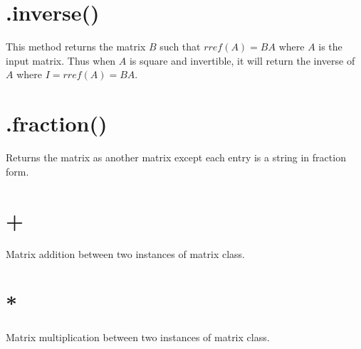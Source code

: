 \documentclass{article}
\begin{document}
\section{.inverse()}
This method returns the matrix \(B\) such that \(rref(A) = BA\) where \(A\) is the input matrix.
Thus when \(A\) is square and invertible, it will return the inverse of \(A\) where \(I = rref(A) = BA\).  

\section{.fraction()}
Returns the matrix as another matrix except each entry is a string in fraction form. 

\section{+}
Matrix addition between two instances of matrix class. 

\section{*}
Matrix multiplication between two instances of matrix class. 
\end{document}
